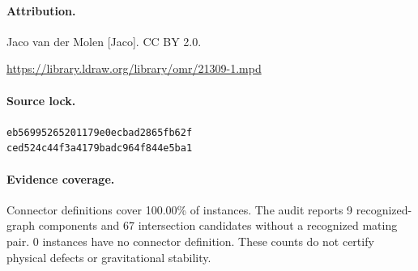 \paragraph{Attribution.}Jaco van der Molen [Jaco]. CC BY 2.0.\par\noindent\url{https://library.ldraw.org/library/omr/21309-1.mpd}
\paragraph{Source lock.}\small\texttt{eb56995265201179e0ecbad2865fb62f}\\\texttt{ced524c44f3a4179badc964f844e5ba1}\normalsize
\paragraph{Evidence coverage.}Connector definitions cover 100.00\% of instances. The audit reports 9 recognized-graph components and 67 intersection candidates without a recognized mating pair. 0 instances have no connector definition. These counts do not certify physical defects or gravitational stability.
